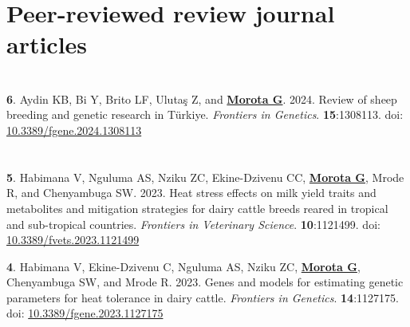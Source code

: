 \documentclass[margin,line,10pt]{res}
\newenvironment{list1}{
  \begin{list}{\ding{113}}{%
      \setlength{\itemsep}{0in}
      \setlength{\parsep}{0in} \setlength{\parskip}{0in}
      \setlength{\topsep}{0in} \setlength{\partopsep}{0in} 
      \setlength{\leftmargin}{0.17in}}}{\end{list}}
\begin{document}
\begin{resume}
\section{\sc Peer-reviewed review journal articles}

\vspace{1.5cm}




 

\section{}
\begin{list1}

  \item  [{\bf 6}.] Aydin KB, Bi Y, Brito LF, Uluta\c{s} Z, and \textbf{\underline{Morota G}}. 2024. Review of sheep breeding and genetic research in T\"{u}rkiye. \emph{Frontiers in Genetics}. \textbf{15}:1308113. doi: \textcolor{blue}{\href{https://doi.org/10.3389/fgene.2024.1308113}{10.3389/fgene.2024.1308113}}

\end{list1}



\section{}
\begin{list1}

  \item  [{\bf 5}.] Habimana V, Nguluma AS, Nziku ZC, Ekine-Dzivenu CC, \textbf{\underline{Morota G}}, Mrode R, and Chenyambuga SW. 2023. Heat stress effects on milk yield traits and metabolites and mitigation strategies for dairy cattle breeds reared in tropical and sub-tropical countries. \emph{Frontiers in Veterinary Science}. \textbf{10}:1121499. doi: \textcolor{blue}{\href{https://doi.org/10.3389/fvets.2023.1121499}{10.3389/fvets.2023.1121499}} 


  \vspace{0.5cm}

  \item  [{\bf 4}.] Habimana V, Ekine-Dzivenu C, Nguluma AS, Nziku ZC, \textbf{\underline{Morota G}}, Chenyambuga SW, and Mrode R. 2023. Genes and models for estimating genetic parameters for heat tolerance in dairy cattle. \emph{Frontiers in Genetics}. \textbf{14}:1127175. doi: \textcolor{blue}{\href{https://doi.org/10.3389/fgene.2023.1127175}{10.3389/fgene.2023.1127175}} 


\end{list1}
\end{resume}
\end{document}
